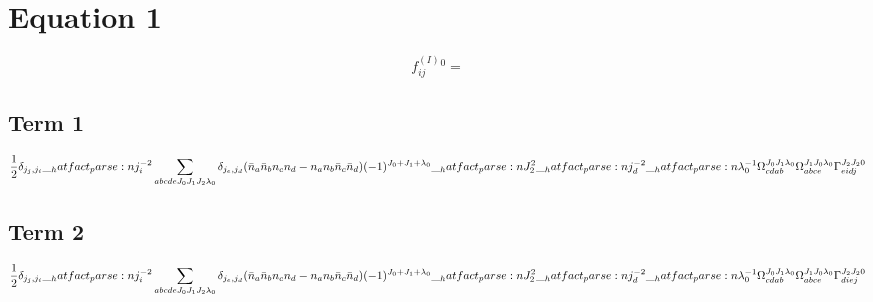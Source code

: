 \documentclass{scrartcl}
\begin{document}
\section{Equation 1}
\begin{dmath*}
f^{(I)}_{i j}^{0} = 
\end{dmath*}
\subsection{Term 1}
\begin{dmath*}
\frac{1}{2} \* \delta_{{j}_{j},{j}_{i}} \* \hatfact{{j}_{i}^{-2}} \* \sum_{a b c d e {J}_{0} {J}_{1} {J}_{2} {{\lambda}}_{0}} \* \delta_{{j}_{e},{j}_{d}} \* (\bar{n}_{a} \* \bar{n}_{b} \* n_{c} \* n_{d} -n_{a} \* n_{b} \* \bar{n}_{c} \* \bar{n}_{d}) \* (-1)^{{J}_{0}+{J}_{1}+{{\lambda}}_{0}} \* \hatfact{{J}_{2}^{2}} \* \hatfact{{j}_{d}^{-2}} \* \hatfact{{{\lambda}}_{0}^{-1}} \* \Omega_{c d a b}^{{J}_{0} {J}_{1} {{\lambda}}_{0}} \* \Omega_{a b c e}^{{J}_{1} {J}_{0} {{\lambda}}_{0}} \* \Gamma_{e i d j}^{{J}_{2} {J}_{2} 0}
\end{dmath*}
\subsection{Term 2}
\begin{dmath*}
\frac{1}{2} \* \delta_{{j}_{j},{j}_{i}} \* \hatfact{{j}_{i}^{-2}} \* \sum_{a b c d e {J}_{0} {J}_{1} {J}_{2} {{\lambda}}_{0}} \* \delta_{{j}_{e},{j}_{d}} \* (\bar{n}_{a} \* \bar{n}_{b} \* n_{c} \* n_{d} -n_{a} \* n_{b} \* \bar{n}_{c} \* \bar{n}_{d}) \* (-1)^{{J}_{0}+{J}_{1}+{{\lambda}}_{0}} \* \hatfact{{J}_{2}^{2}} \* \hatfact{{j}_{d}^{-2}} \* \hatfact{{{\lambda}}_{0}^{-1}} \* \Omega_{c d a b}^{{J}_{0} {J}_{1} {{\lambda}}_{0}} \* \Omega_{a b c e}^{{J}_{1} {J}_{0} {{\lambda}}_{0}} \* \Gamma_{d i e j}^{{J}_{2} {J}_{2} 0}
\end{dmath*}
\end{document}
